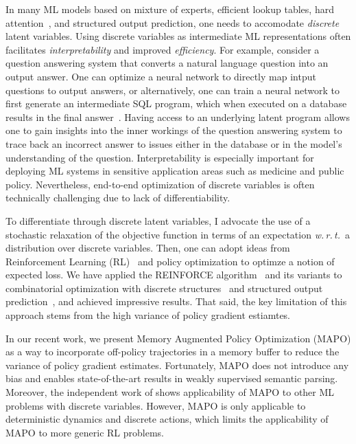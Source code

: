 \documentclass[a4paper, 10pt]{article}
\begin{document}
\hspace{\parindent} In many ML models based on mixture of experts,
efficient lookup tables, hard attention~\cite{hardattention}, and
structured output prediction, one needs to accomodate {\em discrete}
latent variables.  Using discrete variables as intermediate ML
representations often facilitates {\em interpretability} and improved
{\em efficiency}. For example, consider a question answering system
that converts a natural language question into an output answer. One
can optimize a neural network to directly map intput questions to
output answers, or alternatively, one can train a neural network to
first generate an intermediate SQL program, which when executed on a
database results in the final answer~\cite{mapo}. Having access to an
underlying latent program allows one to gain insights into the inner
workings of the question answering system to trace back an incorrect
answer to issues either in the database or in the model's
understanding of the question. Interpretability is especially
important for deploying ML systems in sensitive application areas such
as medicine and public policy. Nevertheless, end-to-end optimization
of discrete variables is often technically challenging due to lack of
differentiability.

To differentiate through discrete latent variables, I advocate the use
of a stochastic relaxation of the objective function in terms of an
expectation {\em w.\,r.\,t.}~a distribution over discrete
variables. Then, one can adopt ideas from Reinforcement Learning
(RL)~\cite{reinforce} and policy optimization to optimze a notion of
expected loss. We have applied the REINFORCE algorithm~\cite{} and its
variants to combinatorial optimization with discrete
structures~\cite{} and structured output prediction~\cite{}, and
achieved impressive results.  That said, the key limitation of this
approach stems from the high variance of policy gradient estiamtes.

In our recent work, we present Memory Augmented Policy Optimization
(MAPO) as a way to incorporate off-policy trajectories in a memory
buffer to reduce the variance of policy gradient
estimates. Fortunately, MAPO does not introduce any bias and enables
state-of-the-art results in weakly supervised semantic
parsing. Moreover, the independent work of \cite{} shows applicability
of MAPO to other ML problems with discrete variables. However, MAPO is
only applicable to deterministic dynamics and discrete actions, which
limits the applicability of MAPO to more generic RL problems.
\end{document}
